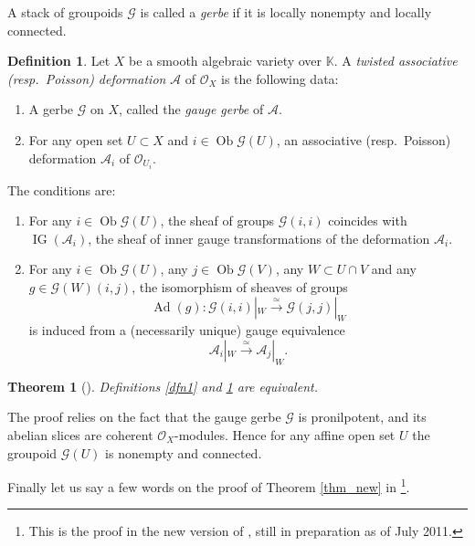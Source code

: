 \documentclass{conm-p-l}
\newtheorem{thm}[equation]{Theorem}
\theoremstyle{definition}
\newtheorem{dfn}[equation]{Definition}
\numberwithin{equation}{section}
\newcommand{\iso}{\stackrel{\simeq}{\longrightarrow}}
\newcommand{\opn}{\operatorname}
\newcommand{\rmitem}[1]{\item[\text{\textup{(#1)}}]}
\newcommand{\mcal}[1]{\mathcal{#1}}
\newcommand{\mbb}[1]{\mathbb{#1}}
\newcommand{\tup}[1]{\textup{#1}}
\newcommand{\bsym}[1]{\boldsymbol{#1}}
\newcommand{\K}{\mbb{K}}
\begin{document}
A stack of groupoids $\bsym{\mcal{G}}$ is called a {\em gerbe} if
it is locally nonempty and locally connected.

\begin{dfn} \label{dfn2}
Let $X$ be a smooth algebraic variety over $\K$. 
A {\em twisted associative \tup{(}resp.\ Poisson\tup{)}
deformation} $\bsym{\mcal{A}}$ of $\mcal{O}_X$ is 
the following data: 
\begin{enumerate}
\item A gerbe $\bsym{\mcal{G}}$ on $X$, called the
{\em gauge gerbe} of $\bsym{\mcal{A}}$. 
\item For any open set $U \subset X$ and 
$i \in \opn{Ob} \bsym{\mcal{G}}(U)$, an associative 
\tup{(}resp.\ Poisson\tup{)} deformation 
$\mcal{A}_i$ of $\mcal{O}_{U_i}$.
\end{enumerate} %
The conditions are: %
\begin{enumerate}
\rmitem{a} For any $i \in \opn{Ob} \bsym{\mcal{G}}(U)$, the sheaf of
groups
$\bsym{\mcal{G}}(i,i)$ coincides with 
$\opn{IG}(\mcal{A}_i)$, the sheaf of inner gauge transformations of
the
deformation $\mcal{A}_i$. %
%
\rmitem{b} For any $i \in \opn{Ob} \bsym{\mcal{G}}(U)$, any
$j \in \opn{Ob} \bsym{\mcal{G}}(V)$, any $W \subset U \cap V$ and any
$g \in \bsym{\mcal{G}}(W)(i,j)$, the isomorphism of sheaves of groups
\[ \opn{Ad}(g) : \mcal{G}(i,i)|_W \iso \mcal{G}(j,j)|_W \]
is induced from a (necessarily unique) gauge equivalence
\[ \mcal{A}_i|_W \iso \mcal{A}_j|_W . \]
\end{enumerate}
\end{dfn}

\begin{thm}[\cite{Ye6}]  \label{thm.last}
Definitions \tup{\ref{dfn1}} and \tup{\ref{dfn2}} are equivalent.
\end{thm} 

The proof relies on the fact that the gauge gerbe $\bsym{\mcal{G}}$ is
pronilpotent, and its abelian slices are coherent $\mcal{O}_X$-modules. Hence
for any affine open set $U$ the groupoid 
$\bsym{\mcal{G}}(U)$ is nonempty and connected.

Finally let us say a few words on the proof of Theorem \ref{thm_new}
in \cite{Ye5} \footnote{This is the proof in the new version of \cite{Ye5},
still in preparation as of July 2011.}.
\end{document}
